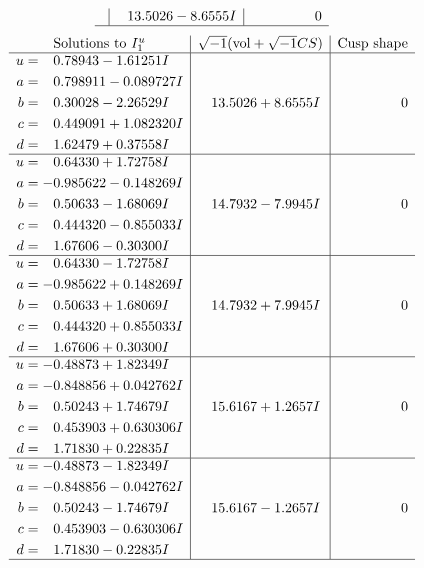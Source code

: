 \documentclass[1p]{elsarticle_modified}
\theoremstyle{definition}
\newcommand{\I}{\sqrt{-1}}
\begin{document}
$$\begin{array}{c|c|c}
 & \phantom{-}13.5026 - 8.6555 I & \phantom{-0.000000 } 0\\
 \hline 
 \end{array}$$\newpage$$\begin{array}{c|c|c}  
\text{Solutions to }I^u_{1}& \I (\text{vol} + \sqrt{-1}CS) & \text{Cusp shape}\\
 \hline 
\begin{aligned}
u &= \phantom{-}0.78943 - 1.61251 I \\
a &= \phantom{-}0.798911 - 0.089727 I \\
b &= \phantom{-}0.30028 - 2.26529 I \\
c &= \phantom{-}0.449091 + 1.082320 I \\
d &= \phantom{-}1.62479 + 0.37558 I\end{aligned}
 & \phantom{-}13.5026 + 8.6555 I & \phantom{-0.000000 } 0 \\ \hline\begin{aligned}
u &= \phantom{-}0.64330 + 1.72758 I \\
a &= -0.985622 - 0.148269 I \\
b &= \phantom{-}0.50633 - 1.68069 I \\
c &= \phantom{-}0.444320 - 0.855033 I \\
d &= \phantom{-}1.67606 - 0.30300 I\end{aligned}
 & \phantom{-}14.7932 - 7.9945 I & \phantom{-0.000000 } 0 \\ \hline\begin{aligned}
u &= \phantom{-}0.64330 - 1.72758 I \\
a &= -0.985622 + 0.148269 I \\
b &= \phantom{-}0.50633 + 1.68069 I \\
c &= \phantom{-}0.444320 + 0.855033 I \\
d &= \phantom{-}1.67606 + 0.30300 I\end{aligned}
 & \phantom{-}14.7932 + 7.9945 I & \phantom{-0.000000 } 0 \\ \hline\begin{aligned}
u &= -0.48873 + 1.82349 I \\
a &= -0.848856 + 0.042762 I \\
b &= \phantom{-}0.50243 + 1.74679 I \\
c &= \phantom{-}0.453903 + 0.630306 I \\
d &= \phantom{-}1.71830 + 0.22835 I\end{aligned}
 & \phantom{-}15.6167 + 1.2657 I & \phantom{-0.000000 } 0 \\ \hline\begin{aligned}
u &= -0.48873 - 1.82349 I \\
a &= -0.848856 - 0.042762 I \\
b &= \phantom{-}0.50243 - 1.74679 I \\
c &= \phantom{-}0.453903 - 0.630306 I \\
d &= \phantom{-}1.71830 - 0.22835 I\end{aligned}
 & \phantom{-}15.6167 - 1.2657 I & \phantom{-0.000000 } 0\\
 \hline 
 \end{array}$$\newpage\newpage\renewcommand{\arraystretch}{1}
\end{document}
